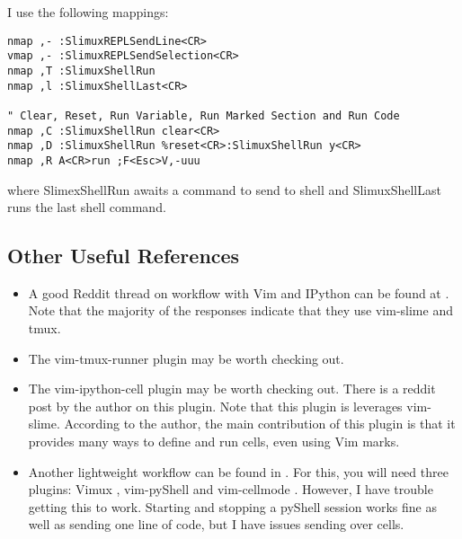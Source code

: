 \documentclass[10pt]{article}
\begin{document}
I use the following mappings:
\begin{lstlisting}
nmap ,- :SlimuxREPLSendLine<CR>
vmap ,- :SlimuxREPLSendSelection<CR>
nmap ,T :SlimuxShellRun 
nmap ,l :SlimuxShellLast<CR>

" Clear, Reset, Run Variable, Run Marked Section and Run Code
nmap ,C :SlimuxShellRun clear<CR>
nmap ,D :SlimuxShellRun %reset<CR>:SlimuxShellRun y<CR>
nmap ,R A<CR>run ;F<Esc>V,-uuu
\end{lstlisting}
where SlimexShellRun awaits a command to send to shell and SlimuxShellLast runs
the last shell command. 

\subsection{Other Useful References}
\begin{itemize}
    \item A good Reddit thread on workflow with Vim and IPython can be found at
        \cite{abdeljalil732020anyone}. Note that the majority of the responses
        indicate that they use vim-slime and tmux.
    \item The vim-tmux-runner plugin \cite{toomey2013tmuxrunner} may be worth checking out. 
    \item The vim-ipython-cell plugin \cite{hanschen2019ipython} may be worth
        checking out. There is a reddit post \cite{hanschen2019reddit} by the
        author on this plugin. Note that this plugin is leverages vim-slime.
        According to the author, the main contribution of this plugin is that it
        provides many ways to define and run cells, even using Vim marks.
    \item Another lightweight workflow can be found in
        \cite{hornung2019boosting}. For this, you will need three plugins: Vimux
        \cite{benmills2009vimux}, vim-pyShell \cite{hornung2019pyShell} and
        vim-cellmode \cite{julienr2016vimcellmode}. However, I have trouble
        getting this to work. Starting and stopping a pyShell session works fine
        as well as sending one line of code, but I have issues sending over
        cells.
\end{itemize}


\nocite{*}


\end{document}
